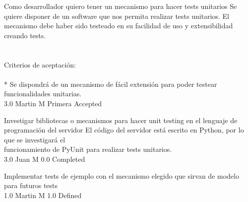\vspace{20pt}

	{Como desarrollador quiero tener un mecanismo para hacer tests unitarios} %
	{Se quiere disponer de un software que nos permita realizar tests unitarios. El\\
mecanismo debe haber sido testeado en su facilidad de uso y extensibilidad\\
creando tests.\\
  \\
  \\
Criterios de aceptación:\\
  \\
* Se dispondrá de un mecanismo de fácil extensión para poder testear funcionalidades unitarias. \\
} %
	{} %
	{3.0} %
	{Martin M} %
	{Primera} %
	{Accepted} %

		{Investigar bibliotecas o mecanismos para hacer unit testing en el lenguaje de programación del servidor} %
		{El código del servidor está escrito en Python, por lo que se investigará el\\
funcionamiento de PyUnit para realizar tests unitarios.\\
} %
		{3.0} %
		{Juan M} %
		{0.0} %
		{Completed} %

		{Implementar tests de ejemplo con el mecanismo elegido que sirvan de modelo para futuros tests} %
		{\\
} %
		{1.0} %
		{Martin M} %
		{1.0} %
		{Defined} %


\vspace{20pt}

